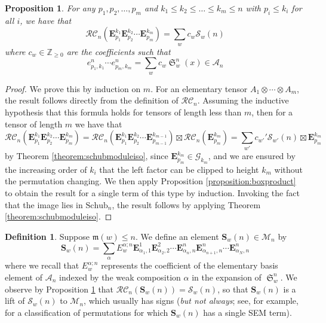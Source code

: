 \documentclass[a4paper,fleqn]{cas-sc}
\newtheorem{proposition}[lemma]{Proposition}
\theoremstyle{definition}
\newtheorem{definition}[lemma]{Definition}
\theoremstyle{remark}
\numberwithin{equation}{subsection}
\DeclareMathOperator{\sch}{\mathfrak{S}}
\newcommand{\grass}{\mathcal{G}}
\newcommand{\RC}{\mathcal{RC}}
\newcommand{\coma}{\mathcal{A}}
\newcommand{\maxd}{\mathfrak{m}}
\begin{document}
\begin{proposition} \label{proposition:eproductworks}
For any $p_1,p_2,\ldots,p_m$ and $k_1\leq k_2\leq\ldots\leq k_m\leq n$ with $p_i\leq k_i$ for all $i$, we have that
$$\RC_n(\mathbf{E}_{p_1}^{k_1}\mathbf{E}_{p_2}^{k_2}\cdots\mathbf{E}_{p_m}^{k_m}) = \sum_{w} c_w\mathcal{S}_w(n)$$
where $c_w\in \mathbb{Z}_{\geq 0}$ are the coefficients such that
$$e_{p_1,k_1}^n\cdots e_{p_m,k_m}^n = \sum_w c_w \sch_w^n(x)\in \coma_n$$
\end{proposition}
\begin{proof}
We prove this by induction on $m$. For an elementary tensor $A_1\otimes \cdots \otimes A_m$, the result follows directly from the definition of $\RC_n$. Assuming the inductive hypothesis that this formula holds for tensors of length less than $m$, then for a tensor of length $m$ we have that
$$\RC_n(\mathbf{E}_{p_1}^{k_1}\mathbf{E}_{p_2}^{k_2}\cdots\mathbf{E}_{p_m}^{k_m}) = \RC_n(\mathbf{E}_{p_1}^{k_1}\mathbf{E}_{p_2}^{k_2}\cdots\mathbf{E}_{p_{m-1}}^{k_{m-1}})\boxtimes \RC_n(\mathbf{E}_{p_m}^{k_m})=\sum_{w'} c_{w'}' \mathcal{S}_{w'}(n)\boxtimes \mathbf{E}_{p_m}^{k_m}$$
by Theorem \ref{theorem:schubmoduleiso}, since $\mathbf{E}_{p_m}^{k_m}\in\grass_{k_m}$, and we are ensured by the increasing order of $k_i$ that the left factor can be clipped to height $k_m$ without the permutation changing. We then apply Proposition \ref{proposition:boxproduct} to obtain the result for a single term of this type by induction. Invoking the fact that the image lies in $\mathrm{Schub}_n$, the result follows by applying Theorem \ref{theorem:schubmoduleiso}.
\end{proof}


\begin{definition}
  Suppose $\maxd(w)\leq n$. We define an element $\mathbf{S}_w(n)\in \mathcal{M}_n$ by
  $$\mathbf{S}_w(n) = \sum_{\alpha} E_w^{\alpha;n}\mathbf{E}_{\alpha_1,1}^1 \mathbf{E}_{\alpha_2,2}^2 \cdots  \mathbf{E}_{\alpha_n,n}^n\mathbf{E}_{\alpha_{n+1}, n}^n\cdots \mathbf{E}_{\alpha_N,n}^n$$
  where we recall that $E_w^{\alpha;n}$ represents the coefficient of the elementary basis element of $\coma_n$ indexed by the weak composition $\alpha$ in the expansion of $\sch_w^n$. We observe by Proposition \ref{proposition:eproductworks} that $\RC_n(\mathbf{S}_w(n)) = \mathcal{S}_w(n)$, so that $\mathbf{S}_w(n)$ is a lift of $\mathcal{S}_w(n)$ to $\mathcal{M}_n$, which usually has signs (\emph{but not always}; see, for example, \cite{woodruff2025single} for a classification of permutations for which $\mathbf{S}_w(n)$ has a single SEM term).
\end{definition}
\end{document}
